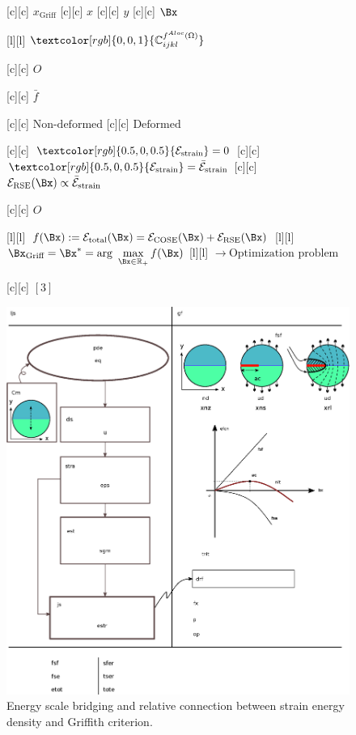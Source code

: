 \begin{figure}[H]
	[c] {$x_{\text{Griff}}$}
	[c] {$x$}
	[c] {$y$}
	[c] {$\Bx$}

	[l] {$\textcolor[rgb]{0,0,1}{\mathbb{C}_{ijkl}^{f^{Aloc}(\Omega)}}$}

	[c] {$O$}

	[c] {$\bar{f}$}

	[c] {$\text{Non-deformed}$}
	[c] {$\text{Deformed}$}

	[c] {$\textcolor[rgb]{0.5,0,0.5}{\mathcal{E}_{\text{strain}}} = 0$}
	[c] {$\textcolor[rgb]{0.5,0,0.5}{\mathcal{E}_{\text{strain}}} = \bar{\mathcal{E}}_{\text{strain}}$}
	[c] {$\mathcal{E}_{\text{RSE}}(\Bx) \propto \bar{\mathcal{E}}_{\text{strain}}$}

	[c] {$O$}

	[l] {$f(\Bx):= \mathcal{E}_{\text{total}}(\Bx) = \mathcal{E}_{\text{COSE}}(\Bx) + \mathcal{E}_{\text{RSE}}(\Bx)$}
	[l] {$\Bx_{\text{Griff}} = \Bx^* = \arg\displaystyle\ \max_{\Bx\in \mathbb{R}_{+}} f(\Bx)$}
	[l] {$\rightarrow \ \text{Optimization problem}$}

	[c] {$[3]$}

	\includegraphics[width=1\textwidth]{griffith_flowchart_plus.eps}
	\caption{Energy scale bridging and relative connection between strain energy density and Griffith criterion.}
	\label{\LABEL}
\end{figure}


